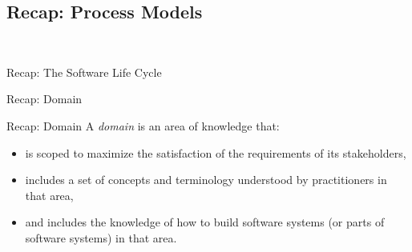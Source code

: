 \subsection{Recap: Process Models}
\begin{frame}{\myframetitle\ }
	\begin{definition}{Recap: The Software Life Cycle\ }
		\renewcommand{\projectcartoonwidth}{.17}
		\waterfallcartoon
	\end{definition}
	\begin{fancycolumns}[animation=none]
	\nextcolumn
	\end{fancycolumns}
\end{frame}

\begin{frame}{Recap: Domain}
	\begin{fancycolumns}[animation=none]
		\begin{definition}{Recap: Domain  \hfill\mysource{\lectureintroduction}}
			\mycitebegin A \emph{domain} is an area of knowledge that:
			\begin{itemize}
				\item is scoped to maximize the satisfaction of the requirements of its stakeholders,
				\item includes a set of concepts and terminology understood by practitioners in that area,
				\item and includes the knowledge of how to build software systems (or parts of
				software systems) in that area.\myciteend
			\end{itemize}
		\end{definition}
	\nextcolumn
	\end{fancycolumns}
\end{frame}

